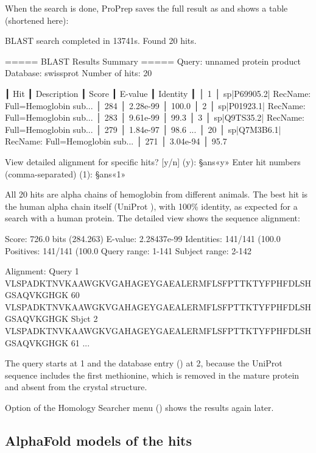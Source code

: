 When the search is done, ProPrep saves the full result as
 and shows a table (shortened here):
\begin{screen}
BLAST search completed in 13741s. Found 20 hits.

===== BLAST Results Summary =====
Query: unnamed protein product
Database: swissprot
Number of hits: 20

┃ Hit ┃ Description                                  ┃ Score ┃ E-value  ┃ Identity ┃
│ 1   │ sp|P69905.2| RecName: Full=Hemoglobin sub... │ 284   │ 2.28e-99 │ 100.0%
│ 2   │ sp|P01923.1| RecName: Full=Hemoglobin sub... │ 283   │ 9.61e-99 │ 99.3%
│ 3   │ sp|Q9TS35.2| RecName: Full=Hemoglobin sub... │ 279   │ 1.84e-97 │ 98.6%
...
│ 20  │ sp|Q7M3B6.1| RecName: Full=Hemoglobin sub... │ 271   │ 3.04e-94 │ 95.7%

View detailed alignment for specific hits? [y/n] (y): §ans«y»
Enter hit numbers (comma-separated) (1): §ans«1»
\end{screen}
All 20 hits are alpha chains of hemoglobin from different animals. The
best hit is the human alpha chain itself (UniProt ), with 100\% identity, as
expected for a search with a human protein. The detailed view shows the
sequence alignment:
\begin{screen}
Score: 726.0 bits (284.263)
E-value: 2.28437e-99
Identities: 141/141 (100.0%
Positives: 141/141 (100.0%
Query range: 1-141
Subject range: 2-142

Alignment:
Query     1  VLSPADKTNVKAAWGKVGAHAGEYGAEALERMFLSFPTTKTYFPHFDLSHGSAQVKGHGK  60
             VLSPADKTNVKAAWGKVGAHAGEYGAEALERMFLSFPTTKTYFPHFDLSHGSAQVKGHGK
Sbjct     2  VLSPADKTNVKAAWGKVGAHAGEYGAEALERMFLSFPTTKTYFPHFDLSHGSAQVKGHGK  61
...
\end{screen}
The query starts at 1 and the database entry () at 2, because
the UniProt sequence includes the first methionine, which is removed in the
mature protein and absent from the crystal structure.

Option  of the Homology Searcher menu ()
shows the results again later.

\subsection{AlphaFold models of the hits}

